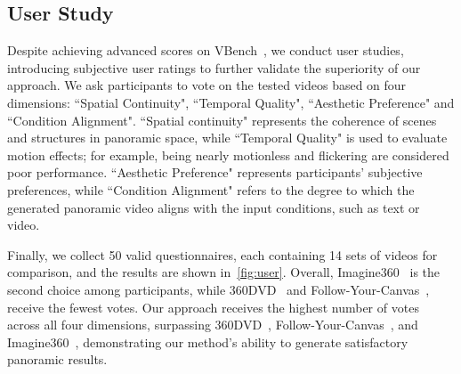 \subsection{User Study}
Despite achieving advanced scores on VBench~\cite{huang2023vbench}, we conduct user studies, introducing subjective user ratings to further validate the superiority of our approach.
%
We ask participants to vote on the tested videos based on four dimensions: ``Spatial Continuity", ``Temporal Quality", ``Aesthetic Preference" and ``Condition Alignment". ``Spatial continuity" represents the coherence of scenes and structures in panoramic space, while ``Temporal Quality" is used to evaluate motion effects; for example, being nearly motionless and flickering are considered poor performance. ``Aesthetic Preference" represents participants' subjective preferences, while ``Condition Alignment" refers to the degree to which the generated panoramic video aligns with the input conditions, such as text or video.
%

Finally, we collect 50 valid questionnaires, each containing 14 sets of videos for comparison, and the results are shown in~\cref{fig:user}.
%
Overall, Imagine360~\cite{tan2024imagine360} is the second choice among participants, while 360DVD~\cite{wang2024360dvd} and Follow-Your-Canvas~\cite{chen2024follow}, receive the fewest votes.
%
Our approach receives the highest number of votes across all four dimensions, surpassing 360DVD~\cite{wang2024360dvd}, Follow-Your-Canvas~\cite{chen2024follow}, and Imagine360~\cite{tan2024imagine360}, demonstrating our method's ability to generate satisfactory panoramic results.
%


